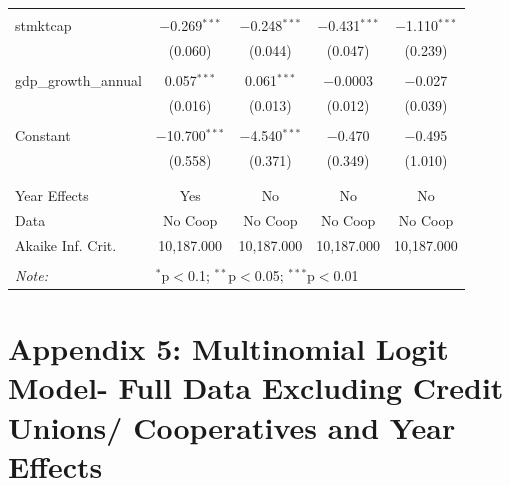 \documentclass[a4paper,nobind]{templates/ociamthesis}
\begin{document}
\begin{table}[!htbp]
\begin{tabular}{@{\extracolsep{5pt}}lcccc}
  & & & & \\ 
 stmktcap & $-$0.269$^{***}$ & $-$0.248$^{***}$ & $-$0.431$^{***}$ & $-$1.110$^{***}$ \\ 
  & (0.060) & (0.044) & (0.047) & (0.239) \\ 
  & & & & \\ 
 gdp\_growth\_annual & 0.057$^{***}$ & 0.061$^{***}$ & $-$0.0003 & $-$0.027 \\ 
  & (0.016) & (0.013) & (0.012) & (0.039) \\ 
  & & & & \\ 
 Constant & $-$10.700$^{***}$ & $-$4.540$^{***}$ & $-$0.470 & $-$0.495 \\ 
  & (0.558) & (0.371) & (0.349) & (1.010) \\ 
  & & & & \\ 
\hline \\[-1.8ex] 
Year Effects & Yes & No & No & No \\ 
Data & No Coop & No Coop & No Coop & No Coop \\ 
Akaike Inf. Crit. & 10,187.000 & 10,187.000 & 10,187.000 & 10,187.000 \\ 
\hline 
\hline \\[-1.8ex] 
\textit{Note:}  & \multicolumn{4}{l}{$^{*}$p$<$0.1; $^{**}$p$<$0.05; $^{***}$p$<$0.01} \\ 
\end{tabular} 
\end{table}

\newpage

\hypertarget{appendix-5-multinomial-logit-model--full-data-excluding-credit-unions-cooperatives-and-year-effects}{%
\section{Appendix 5: Multinomial Logit Model- Full Data Excluding Credit Unions/ Cooperatives and Year Effects}\label{appendix-5-multinomial-logit-model--full-data-excluding-credit-unions-cooperatives-and-year-effects}}
\end{document}
